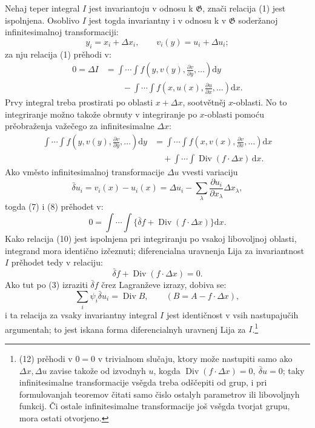 \documentclass[11pt]{article}
\providecommand{\G}{\mathfrak G}
\providecommand{\D}{\Delta}
\providecommand{\p}{\partial}
\providecommand{\dd}{\mathrm d}
\DeclareMathOperator{\Div}{Div}
\providecommand{\bd}{\bar{\delta}}
\begin{document}
Nehaj teper integral \(I\) jest invariantoju v odnosu k \(\G\), znači relacija (1) jest ispolnjena. Osoblivo \(I\) jest togda invariantny i v odnosu k v \(\G\) soderžanoj infinitesimalnoj transformaciji:
\[
y_i=x_i+\D x_i,\qquad v_i(y)=u_i+\D u_i;
\]
za nju relacija (1) prěhodi v:
\begin{equation}
\begin{aligned}
0=\D I
&=\int\!\cdots\!\int f\!\left(y,v(y),\frac{\p v}{\p y},\ldots\right)\dd y\\
&\qquad-\int\!\cdots\!\int f\!\left(x,u(x),\frac{\p u}{\p x},\ldots\right)\dd x.
\end{aligned}
\tag{7}
\end{equation}
Prvy integral treba prostirati po oblasti \(x+\D x\), sootvětněj \(x\)-oblasti. No to integriranje možno takože obrnuty v integriranje po \(x\)-oblasti pomoću prěobraženja važečego za infinitesimalne \(\D x\):
\begin{equation}
\begin{aligned}
\int\!\cdots\!\int f\!\left(y,v(y),\frac{\p v}{\p y},\ldots\right)\dd y
&=\int\!\cdots\!\int f\!\left(x,v(x),\frac{\p v}{\p x},\ldots\right)\dd x\\
&\quad+\int\!\cdots\!\int \Div(f\cdot \D x)\,\dd x.
\end{aligned}
\tag{8}
\end{equation}
Ako vměsto infinitesimalnoj transformacije \(\D u\) vvesti variaciju
\begin{equation}
\bd u_i=v_i(x)-u_i(x)=\D u_i-\sum_\lambda\frac{\p u_i}{\p x_\lambda}\D x_\lambda,
\tag{9}
\end{equation}
togda (7) i (8) prěhodet v:
\begin{equation}
0=\int\!\cdots\!\int\{\bd f+\Div(f\cdot\D x)\}\dd x.
\tag{10}
\end{equation}
Kako relacija (10) jest ispolnjena pri integriranju po vsakoj libovoljnoj oblasti, integrand mora identično izčeznuti; diferencialna uravnenja Lija za invariantnost \(I\) prěhodet tedy v relaciju:
\begin{equation}
\bd f+\Div(f\cdot\D x)=0.
\tag{11}
\end{equation}
Ako tut po (3) izraziti \(\bd f\) črez Lagranževe izrazy, dobiva se:
\begin{equation}
\sum_i\psi_i\bd u_i=\Div B,\qquad (B=A-f\cdot\D x),
\tag{12}
\end{equation}
i ta relacija za vsaky invariantny integral \(I\) jest identičnost v vsih nastupajučih argumentah; to jest iskana forma diferencialnyh uravnenj Lija za \(I\).\footnote{(12) prěhodi v \(0=0\) v trivialnom slučaju, ktory može nastupiti samo ako \(\D x,\D u\) zavise takože od izvodnyh \(u\), kogda \(\Div(f\cdot\D x)=0,\ \bd u=0\); taky infinitesimalne transformacije vsěgda treba odščepiti od grup, i pri formulovanjah teoremov čitati samo čislo ostalyh parametrov ili libovoljnyh funkcij. Či ostale infinitesimalne transformacije još vsěgda tvorjat grupu, mora ostati otvorjeno.}
\end{document}

